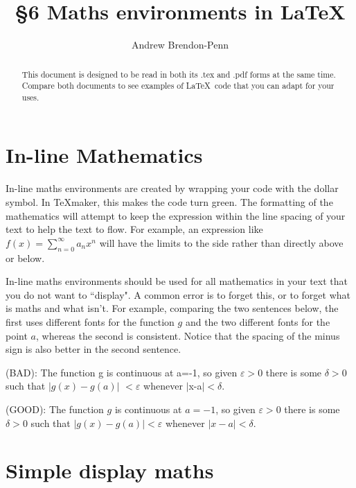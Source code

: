 \documentclass[a4paper,11pt]{article}
\title{\S6 Maths environments in \LaTeX }
\author{Andrew Brendon-Penn}
\begin{document}
\maketitle  %

\begin{abstract}
This document is designed to be read in both its .tex and .pdf forms at the same time. Compare both documents to see examples of \LaTeX \, code that you can adapt for your uses.
\end{abstract}

\tableofcontents 

\pagebreak

\section{In-line Mathematics}

In-line maths environments are created by wrapping your code with the dollar symbol. In TeXmaker, this makes the code turn green. The formatting of the mathematics will attempt to keep the expression within the line spacing of your text to help the text to flow. For example, an expression like $f(x) = \sum_{n=0}^{\infty} a_n x^n$ will have the limits to the side rather than directly above or below. 

In-line maths environments should be used for all mathematics in your text that you do not want to ``display". A common error is to forget this, or to forget what is maths and what isn't. For example, comparing the two sentences below, the first uses different fonts for the function $g$ and the two different fonts for the point $a$, whereas the second is consistent. Notice that the spacing of the minus sign is also better in the second sentence. 

(BAD): The function g is continuous at a=-1, so given $\varepsilon >$0 there is some $\delta>$0 such that $|g(x)-g(a)|$ $<\varepsilon$ whenever $|$x-a$|<\delta$.

(GOOD): The function $g$ is continuous at $a=-1$, so given $\varepsilon >0$ there is some $\delta>0$ such that $|g(x)-g(a)|<\varepsilon$ whenever $|x-a|<\delta$.

\section{Simple display maths}
\end{document}

